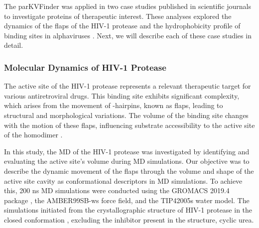 \documentclass[Ingles]{phdthesis}
\begin{document}
The parKVFinder was applied in two case studies published in scientific journals to investigate proteins of therapeutic interest. These analyses explored the dynamics of the flaps of the \ac{HIV-1} protease \cite{guerra2020} and the hydrophobicity profile of binding sites in alphaviruses \cite{ribeiro2021}. Next, we will describe each of these case studies in detail.

\subsubsection{Molecular Dynamics of HIV-1 Protease \label{sec:md-hiv1-protease}}

The active site of the HIV-1 protease represents a relevant therapeutic target for various antiretroviral drugs. This binding site exhibits significant complexity, which arises from the movement of \textbeta-hairpins, known as flaps, leading to structural and morphological variations. The volume of the binding site changes with the motion of these flaps, influencing substrate accessibility to the active site of the homodimer \cite{lam1994,soares2016}.

In this study, the \acs{MD} of the HIV-1 protease was investigated by identifying and evaluating the active site's volume during \acs{MD} simulations. Our objective was to describe the dynamic movement of the flaps through the volume and shape of the active site cavity as conformational descriptors in \acs{MD} simulations. To achieve this, 200 ns \acs{MD} simulations were conducted using the GROMACS 2019.4 package \cite{gromacs}, the AMBER99SB-ws force field, and the TIP42005s water model. The simulations initiated from the crystallographic structure of HIV-1 protease in the closed conformation \cite{lam1994}, excluding the inhibitor present in the structure, cyclic urea.
\end{document}
